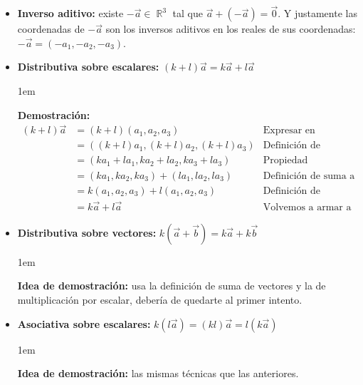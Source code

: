 \documentclass[12pt, fleqn]{report}                             %
\newenvironment{SmallIndentation}[1][0.75em]                    %
    {\begin{adjustwidth}{#1}{}\begin{footnotesize}}                 %
    {\end{footnotesize}\end{adjustwidth}}                           %
\DeclareMathOperator \Reals        {\mathbb{R}}                 %
\begin{document}
\begin{itemize}
                \item \textbf{Inverso aditivo:} existe $-\vec{a} \in \Reals^3$ tal que $\vec{a}+\left(-\vec{a}\right)=\vec{0}$. Y justamente las coordenadas de $-\vec{a}$ son los inversos aditivos en los reales de sus coordenadas: $-\vec{a}=(-a_1, -a_2, -a_3)$.
                
                \item \textbf{Distributiva sobre escalares:} $(k+l)\vec{a}=k\vec{a}+l\vec{a}$
                
                \begin{SmallIndentation}[1em]
                    \textbf{Demostración:}
                    \begin{align*}
                        (k+l)\vec{a} &= (k+l)(a_1, a_2, a_3) &\mbox{Expresar en coordenadas}\\
                        &= ((k+l)a_1, (k+l)a_2, (k+l)a_3) &\mbox{Definición de producto por escalar}\\
                        &= (ka_1 + la_1, ka_2 + la_2, ka_3 + la_3) &\mbox{Propiedad distributiva en los reales}\\
                        &= (ka_1, ka_2, ka_3) + (la_1, la_2, la_3) &\mbox{Definición de suma a la inversa}\\
                        &= k(a_1, a_2, a_3) + l(a_1, a_2, a_3) &\mbox{Definición de producto a la inversa}\\
                        &= k\vec{a} + l\vec{a} &\mbox{Volvemos a armar a los vectores}
                    \end{align*}
                \end{SmallIndentation}
                
                \item \textbf{Distributiva sobre vectores:} $k\left(\vec{a}+\vec{b}\right)=k\vec{a}+k\vec{b}$
                
                \begin{SmallIndentation}[1em]
                    \textbf{Idea de demostración:} usa la definición de suma de vectores y la de multiplicación por escalar, debería de quedarte al primer intento.
                \end{SmallIndentation}
                
                \item \textbf{Asociativa sobre escalares:} $k\left(l\vec{a}\right)=(kl)\vec{a}=l\left(k\vec{a}\right)$
                
                \begin{SmallIndentation}[1em]
                    \textbf{Idea de demostración:} las mismas técnicas que las anteriores.
                \end{SmallIndentation}
            \end{itemize}
        
\end{document}
